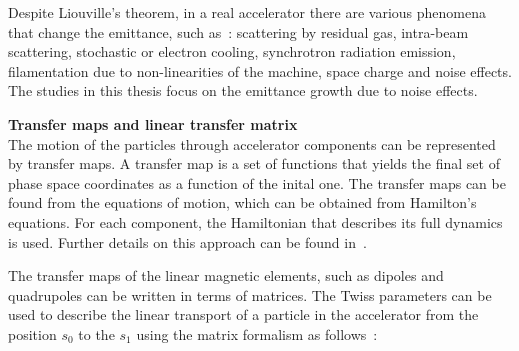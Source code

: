  
 
Despite Liouville's theorem, in a real accelerator there are various phenomena that change the emittance, such as~\cite{Buon:216507}: scattering by residual gas, intra-beam scattering, stochastic or electron cooling, synchrotron radiation emission, filamentation due to non-linearities of the machine, space charge and noise effects. The studies in this thesis focus on the emittance growth due to noise effects.
 

\textbf{Transfer maps and linear transfer matrix}\\
The motion of the particles through accelerator components can be represented by transfer maps. A transfer map is a set of functions that yields the final set of phase space coordinates as a function of the inital one.
The transfer maps can be found from the equations of motion, which can be obtained from Hamilton's equations. For each component, the Hamiltonian that describes its full dynamics is used. Further details on this approach can be found in~\cite{wolski2014}. %

The transfer maps of the linear magnetic elements, such as dipoles and quadrupoles can be written in terms of matrices. The Twiss parameters can be used to describe the linear transport of a particle in the accelerator from the position $s_0$ to the $s_1$ using the matrix formalism as follows~\cite{Lee:1425444}: %

